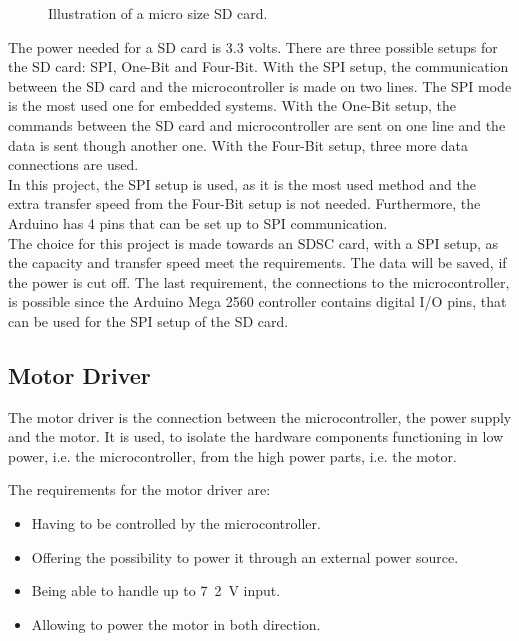 \begin{minipage}{\linewidth}
\begin{minipage}{0.30\linewidth}
\begin{figure}[H]
              \caption{Illustration of a micro size SD card.} %
              \label{SDcardpinout}
          \end{figure}
      \end{minipage}
      
  \end{minipage}

The power needed for a SD card is 3.3 volts. There are three possible setups for the SD card: SPI, One-Bit and Four-Bit.
With the SPI setup, the communication between the SD card and the microcontroller is made on two lines. The SPI mode is the most used one for embedded systems.
With the One-Bit setup, the commands between the SD card and microcontroller are sent on one line and the data is sent though another one.
With the Four-Bit setup, three more data connections are used.\\
%
In this project, the SPI setup is used, as it is the most used method and the extra transfer speed from the Four-Bit setup is not needed. Furthermore, the Arduino has 4 pins that can be set up to SPI communication.\\

The choice for this project is made towards an SDSC card, with a SPI setup, as the capacity and transfer speed meet the requirements. The data will be saved, if the power is cut off. The last requirement, the connections to the microcontroller, is possible since the Arduino Mega 2560 controller contains digital I/O pins, that can be used for the SPI setup of the SD card.



\subsection{Motor Driver}
The motor driver is the connection between the microcontroller, the power supply and the motor. It is used, to isolate the hardware components functioning in low power, i.e. the microcontroller, from the high power parts, i.e. the motor.

The requirements for the motor driver are:
\begin{itemize}
\item Having to be controlled by the microcontroller.
\item Offering the possibility to power it through an external power source.
\item Being able to handle up to \si{7.2 V} input. 
\item Allowing to power the motor in both direction.
\end{itemize}

